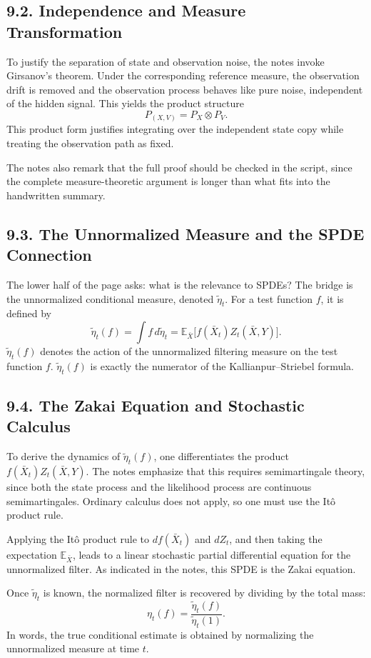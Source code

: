 \documentclass[11pt]{article}
\theoremstyle{definition}
\theoremstyle{remark}
\begin{document}
\subsection*{9.2. Independence and Measure Transformation}
To justify the separation of state and observation noise, the notes invoke Girsanov's theorem. Under the corresponding reference measure, the observation drift is removed and the observation process behaves like pure noise, independent of the hidden signal. This yields the product structure
\[
P_{(X,V)}=P_X\otimes P_V.
\]
This product form justifies integrating over the independent state copy while treating the observation path as fixed.

The notes also remark that the full proof should be checked in the script, since the complete measure-theoretic argument is longer than what fits into the handwritten summary.

\subsection*{9.3. The Unnormalized Measure and the SPDE Connection}
The lower half of the page asks: what is the relevance to SPDEs? The bridge is the unnormalized conditional measure, denoted $\tilde \eta_t$. For a test function $f$, it is defined by
\[
\tilde \eta_t(f)
=
\int f\,d\tilde \eta_t
=
\mathbb E_{\bar X}\bigl[f(\bar X_t)Z_t(\bar X,Y)\bigr].
\]
$\tilde \eta_t(f)$ denotes the action of the unnormalized filtering measure on the test function $f$.
$\tilde \eta_t(f)$ is exactly the numerator of the Kallianpur--Striebel formula.

\subsection*{9.4. The Zakai Equation and Stochastic Calculus}
To derive the dynamics of $\tilde \eta_t(f)$, one differentiates the product $f(\bar X_t)Z_t(\bar X,Y)$. The notes emphasize that this requires semimartingale theory, since both the state process and the likelihood process are continuous semimartingales. Ordinary calculus does not apply, so one must use the It\^o product rule.

Applying the It\^o product rule to $df(\bar X_t)$ and $dZ_t$, and then taking the expectation $\mathbb E_{\bar X}$, leads to a linear stochastic partial differential equation for the unnormalized filter. As indicated in the notes, this SPDE is the Zakai equation.

Once $\tilde \eta_t$ is known, the normalized filter is recovered by dividing by the total mass:
\[
\eta_t(f)=\frac{\tilde \eta_t(f)}{\tilde \eta_t(1)}.
\]
In words, the true conditional estimate is obtained by normalizing the unnormalized measure at time $t$.
\end{document}
